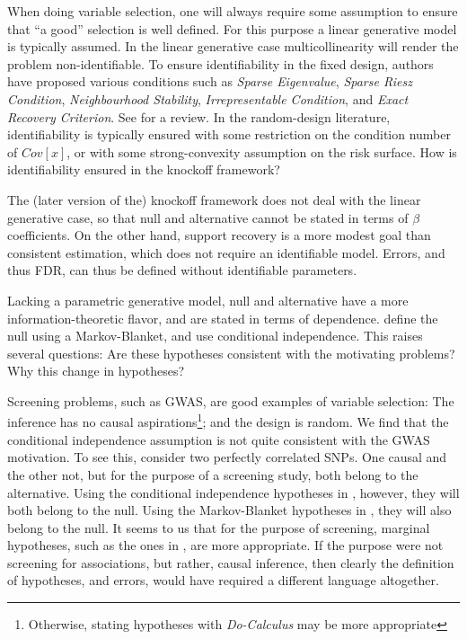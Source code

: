\documentclass[article,lineno]{biometrika}
\begin{document}
When doing variable selection, one will always require some assumption to ensure that ``a good'' selection is well defined. 
For this purpose a linear generative model is typically assumed. 
In the linear generative case multicollinearity will render the problem non-identifiable. 
To ensure identifiability in the fixed design, authors have proposed various conditions such as \emph{Sparse Eigenvalue}, \emph{Sparse Riesz Condition}, \emph{Neighbourhood Stability}, \emph{Irrepresentable Condition}, and \emph{Exact Recovery Criterion}. 
See \citet[Sec 3.1.1]{MeinshausenStabilityselection2010} for a review. 
In the random-design literature, identifiability is typically ensured with some restriction on the condition number of $Cov[x]$, or with some strong-convexity assumption on the risk surface. 
How is identifiability ensured in the knockoff framework? 

The (later version of the) knockoff framework does not deal with the linear generative case, so that null and alternative cannot be stated in terms of $\beta$ coefficients. 
On the other hand, support recovery is a more modest goal than consistent estimation, which does not require an identifiable model. 
Errors, and thus FDR, can thus be defined without identifiable parameters. 

Lacking a parametric generative model, null and alternative have a more information-theoretic flavor, and are stated in terms of dependence. 
\citet{CandesPanninggoldmodelX2018} define the null using a Markov-Blanket, and \cite{SesiaGenehuntinghidden} use conditional independence. 
This raises several questions:
Are these hypotheses consistent with the motivating problems?
Why this change in hypotheses?

Screening problems, such as GWAS, are good examples of variable selection:
The inference has no causal aspirations\footnote{Otherwise, stating hypotheses with \emph{Do-Calculus} \citep{pearl1995causal} may be more appropriate};
and the design is random.
We find that the conditional independence assumption is not quite consistent with the GWAS motivation. 
To see this, consider two perfectly correlated SNPs. 
One causal and the other not, but for the purpose of a screening study, both belong to the alternative. 
Using the conditional independence hypotheses in \cite{SesiaGenehuntinghidden}, however, they will both belong to the null. 
Using the Markov-Blanket hypotheses in \cite{CandesPanninggoldmodelX2018}, they will also belong to the null. 
It seems to us that for the purpose of screening, marginal hypotheses, such as the ones in \cite{TusherSignificanceanalysismicroarrays2001}, are more appropriate. 
If the purpose were not screening for associations, but rather, causal inference, then clearly the definition of hypotheses, and errors, would have required a different language altogether. 
\end{document}
